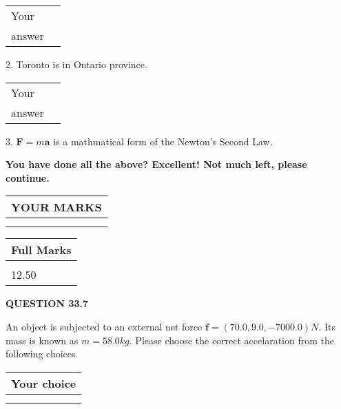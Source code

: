 \documentclass[12pt]{article}
\begin{document}
\noindent\begin{tabular}{|l|l|}\hline Your&\hspace{.2in} \\ answer&\hspace{.2in} \\ \hline \end{tabular}
2.  %
Toronto is in  %
Ontario province.
 
\noindent\begin{tabular}{|l|l|}\hline Your&\hspace{.2in} \\ answer&\hspace{.2in} \\ \hline \end{tabular}
3.  %
$\mathbf{F}=m\mathbf{a}$ is a mathmatical form of
the Newton's Second Law.
 

 
\vspace{0.3in}
   
   
\vspace{0.3in}
{\textbf{\LARGE{You have done all the above? Excellent! Not much left, please continue.}}}
\vspace{0.3in}
   
   
  
\vspace{0.2in}
  
\noindent\begin{tabular}{|l|}
\hline
 YOUR MARKS  \\
\hline
 \\ 
 \\ 
\hline
\end{tabular}
\hspace{0.05in} \begin{tabular}{|l|}
\hline
 Full Marks  \\
\hline
 \\ 
12.50 \\
\hline
\end{tabular}
{\textbf{\Large{QUESTION
33.7 
}}}
  
  
 
An object is subjected to an external net force $\mathbf{f}=
(70.0 , 9.0 , -7000.0) N$.
Its mass is known as $m= %
58.0 kg$.
Please choose the correct accelaration from the following choices.
  
  
\noindent\hspace{3.0in} \begin{tabular}{|l|}
\hline
Your choice \\
\hline
 \\ 
 \\ 
\hline
\end{tabular}
  
\end{document}
